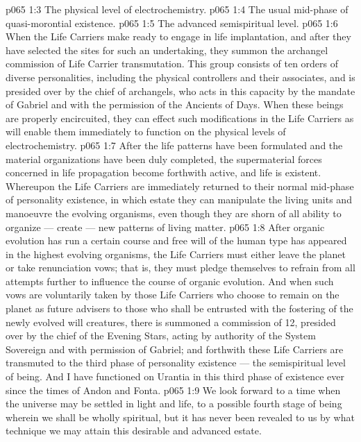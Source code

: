 \vs p065 1:3 \bibnobreakspace The physical level of electrochemistry.
\vs p065 1:4 \bibnobreakspace The usual mid\hyp{}phase of quasi\hyp{}morontial existence.
\vs p065 1:5 \bibnobreakspace The advanced semispiritual level.
\vs p065 1:6 \pc When the Life Carriers make ready to engage in life implantation, and after they have selected the sites for such an undertaking, they summon the archangel commission of Life Carrier transmutation. This group consists of ten orders of diverse personalities, including the physical controllers and their associates, and is presided over by the chief of archangels, who acts in this capacity by the mandate of Gabriel and with the permission of the Ancients of Days. When these beings are properly encircuited, they can effect such modifications in the Life Carriers as will enable them immediately to function on the physical levels of electrochemistry.
\vs p065 1:7 After the life patterns have been formulated and the material organizations have been duly completed, the supermaterial forces concerned in life propagation become forthwith active, and life is existent. Whereupon the Life Carriers are immediately returned to their normal mid\hyp{}phase of personality existence, in which estate they can manipulate the living units and manoeuvre the evolving organisms, even though they are shorn of all ability to organize --- create --- new patterns of living matter.
\vs p065 1:8 After organic evolution has run a certain course and free will of the human type has appeared in the highest evolving organisms, the Life Carriers must either leave the planet or take renunciation vows; that is, they must pledge themselves to refrain from all attempts further to influence the course of organic evolution. And when such vows are voluntarily taken by those Life Carriers who choose to remain on the planet as future advisers to those who shall be entrusted with the fostering of the newly evolved will creatures, there is summoned a commission of 12, presided over by the chief of the Evening Stars, acting by authority of the System Sovereign and with permission of Gabriel; and forthwith these Life Carriers are transmuted to the third phase of personality existence --- the semispiritual level of being. And I have functioned on Urantia in this third phase of existence ever since the times of Andon and Fonta.
\vs p065 1:9 We look forward to a time when the universe may be settled in light and life, to a possible fourth stage of being wherein we shall be wholly spiritual, but it has never been revealed to us by what technique we may attain this desirable and advanced estate.
